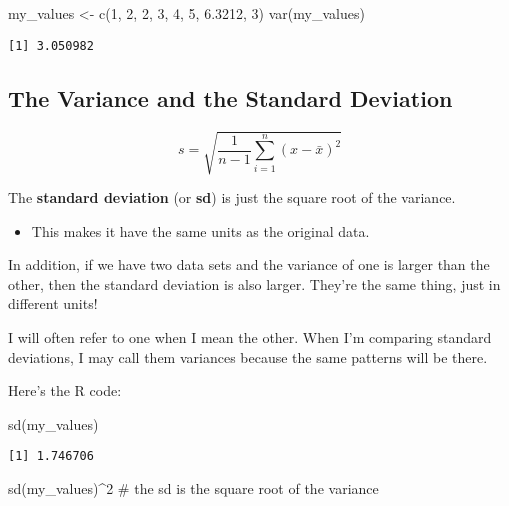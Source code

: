 \documentclass[
  letterpaper,
  DIV=11,
  numbers=noendperiod]{scrreprt}
\newenvironment{Shaded}{\begin{snugshade}}{\end{snugshade}}
\newcommand{\CommentTok}[1]{\textcolor[rgb]{0.37,0.37,0.37}{#1}}
\newcommand{\DecValTok}[1]{\textcolor[rgb]{0.68,0.00,0.00}{#1}}
\newcommand{\FloatTok}[1]{\textcolor[rgb]{0.68,0.00,0.00}{#1}}
\newcommand{\FunctionTok}[1]{\textcolor[rgb]{0.28,0.35,0.67}{#1}}
\newcommand{\NormalTok}[1]{\textcolor[rgb]{0.00,0.23,0.31}{#1}}
\newcommand{\OtherTok}[1]{\textcolor[rgb]{0.00,0.23,0.31}{#1}}
\newcommand{\SpecialCharTok}[1]{\textcolor[rgb]{0.37,0.37,0.37}{#1}}
\providecommand{\tightlist}{%
  \setlength{\itemsep}{0pt}\setlength{\parskip}{0pt}}\usepackage{longtable,booktabs,array}
\begin{document}
\begin{Shaded}
\begin{Highlighting}[]
\NormalTok{my\_values }\OtherTok{\textless{}{-}} \FunctionTok{c}\NormalTok{(}\DecValTok{1}\NormalTok{, }\DecValTok{2}\NormalTok{, }\DecValTok{2}\NormalTok{, }\DecValTok{3}\NormalTok{, }\DecValTok{4}\NormalTok{, }\DecValTok{5}\NormalTok{, }\FloatTok{6.3212}\NormalTok{, }\DecValTok{3}\NormalTok{)}
\FunctionTok{var}\NormalTok{(my\_values)}
\end{Highlighting}
\end{Shaded}

\begin{verbatim}
[1] 3.050982
\end{verbatim}

\hypertarget{the-variance-and-the-standard-deviation}{%
\subsection{The Variance and the Standard
Deviation}\label{the-variance-and-the-standard-deviation}}

\[
s = \sqrt{\frac{1}{n-1}\sum_{i=1}^n(x - \bar x)^2}
\]

The \textbf{standard deviation} (or \textbf{sd}) is just the square root
of the variance.

\begin{itemize}
\tightlist
\item
  This makes it have the same units as the original data.
\end{itemize}

In addition, if we have two data sets and the variance of one is larger
than the other, then the standard deviation is also larger. They're the
same thing, just in different units!

I will often refer to one when I mean the other. When I'm comparing
standard deviations, I may call them variances because the same patterns
will be there.

Here's the R code:

\begin{Shaded}
\begin{Highlighting}[]
\FunctionTok{sd}\NormalTok{(my\_values)}
\end{Highlighting}
\end{Shaded}

\begin{verbatim}
[1] 1.746706
\end{verbatim}

\begin{Shaded}
\begin{Highlighting}[]
\FunctionTok{sd}\NormalTok{(my\_values)}\SpecialCharTok{\^{}}\DecValTok{2} \CommentTok{\# the sd is the square root of the variance}
\end{Highlighting}
\end{Shaded}
\end{document}
